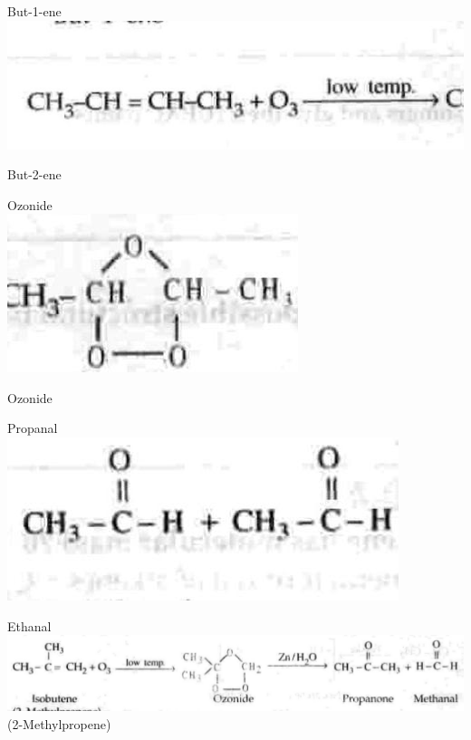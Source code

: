 \documentclass[10pt]{article}
\begin{document}
But-1-ene\\
\includegraphics[max width=\textwidth, center]{2025_01_28_8470952b98110cec3aabg-197}

But-2-ene

Ozonide\\
\includegraphics[max width=\textwidth, center]{2025_01_28_8470952b98110cec3aabg-197(1)}

Ozonide

Propanal\\
\includegraphics[max width=\textwidth, center]{2025_01_28_8470952b98110cec3aabg-197(3)}

Ethanal\\
\includegraphics[max width=\textwidth, center]{2025_01_28_8470952b98110cec3aabg-198(1)}\\
(2-Methylpropene)
\end{document}
